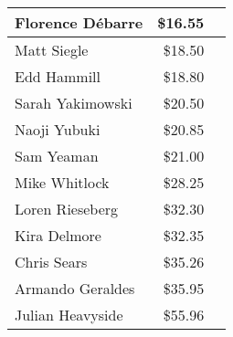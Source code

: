 \begin{longtable}{|l|r|c|}
Florence D\'ebarre & \$16.55 & \\\hline
Matt Siegle & \$18.50 & \\\hline
Edd Hammill & \$18.80 & \\\hline
Sarah Yakimowski & \$20.50 & \\\hline
Naoji Yubuki & \$20.85 & \\\hline
Sam Yeaman & \$21.00 & \\\hline
Mike Whitlock & \$28.25 & \\\hline
Loren Rieseberg & \$32.30 & \\\hline
Kira Delmore & \$32.35 & \\\hline
Chris Sears & \$35.26 & \\\hline
Armando Geraldes & \$35.95 & \\\hline
Julian Heavyside & \$55.96 & \\\hline
\end{longtable}
